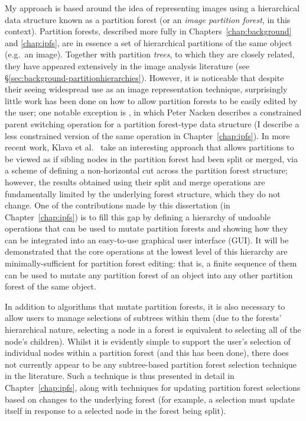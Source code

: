 My approach is based around the idea of representing images using a hierarchical data structure known as a partition forest (or an \emph{image partition forest}, in this context). Partition forests, described more fully in Chapters~\ref{chap:background} and \ref{chap:ipfs}, are in essence a set of hierarchical partitions of the same object (e.g.~an image). Together with partition \emph{trees}, to which they are closely related, they have appeared extensively in the image analysis literature (see \S\ref{sec:background-partitionhierarchies}). However, it is noticeable that despite their seeing widespread use as an image representation technique, surprisingly little work has been done on how to allow partition forests to be easily edited by the user; one notable exception is \cite{nacken95}, in which Peter Nacken describes a constrained parent switching operation for a partition forest-type data structure (I describe a less constrained version of the same operation in Chapter~\ref{chap:ipfs}). In more recent work, Klava et al.~\cite{klava09} take an interesting approach that allows partitions to be viewed as if sibling nodes in the partition forest had been split or merged, via a scheme of defining a non-horizontal cut across the partition forest structure; however, the results obtained using their split and merge operations are fundamentally limited by the underlying forest structure, which they do not change. One of the contributions made by this dissertation (in Chapter~\ref{chap:ipfs}) is to fill this gap by defining a hierarchy of undoable operations that can be used to mutate partition forests and showing how they can be integrated into an easy-to-use graphical user interface (GUI). It will be demonstrated that the core operations at the lowest level of this hierarchy are minimally-sufficient for partition forest editing: that is, a finite sequence of them can be used to mutate any partition forest of an object into any other partition forest of the same object.

In addition to algorithms that mutate partition forests, it is also necessary to allow users to manage selections of subtrees within them (due to the forests' hierarchical nature, selecting a node in a forest is equivalent to selecting all of the node's children). Whilst it is evidently simple to support the user's selection of individual nodes within a partition forest (and this has been done), there does not currently appear to be any subtree-based partition forest selection technique in the literature. Such a technique is thus presented in detail in Chapter~\ref{chap:ipfs}, along with techniques for updating partition forest selections based on changes to the underlying forest (for example, a selection must update itself in response to a selected node in the forest being split).

